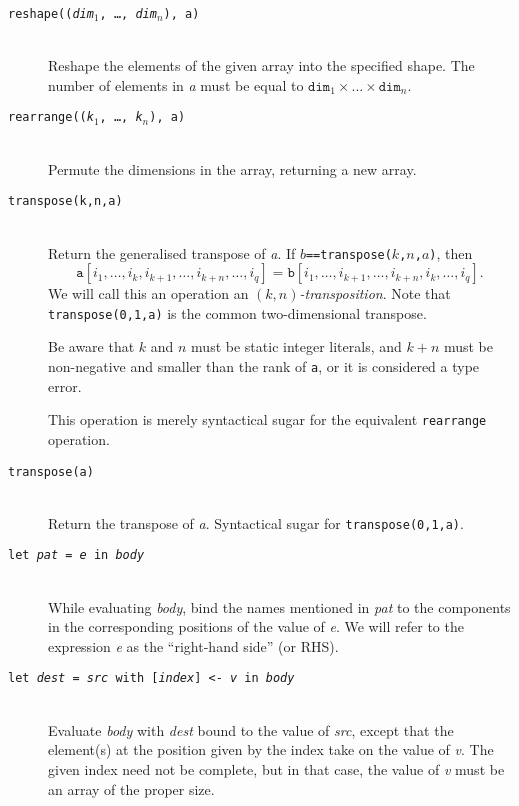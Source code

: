 \documentclass[oneside]{memoir}
\begin{document}
\begin{description}
  \item[\texttt{reshape((\textit{dim}$_{1}$, \ldots, \textit{dim}$_{n}$), a)}]\hfill\\
    Reshape the elements of the given array into the specified shape.
    The number of elements in \textit{a} must be equal to
    $\texttt{dim}_{1}\times\ldots\times\texttt{dim}_{n}$.

  \item[\texttt{rearrange((\textit{k}$_{1}$, \ldots, \textit{k}$_{n}$), a)}]\hfill\\
    Permute the dimensions in the array, returning a new array.

  \item[\texttt{transpose(k,n,a)}]\hfill\\
    Return the generalised transpose of \textit{a}.  If
    \texttt{$b$==transpose($k$,$n$,$a$)}, then
    \[
    \texttt{a}[i_1, \ldots, i_k, i_{k+1}, \ldots, i_{k+n}, \ldots, i_q ]
    =
    \texttt{b}[i_1 , \ldots, i_{k+1} , \ldots, i_{k+n}, i_k, \ldots, i_q ].
    \]
    We will call this an operation an \textit{$(k,n)$-transposition}.
    Note that \texttt{transpose(0,1,a)} is the common two-dimensional
    transpose.

    Be aware that $k$ and $n$ must be static integer literals, and
    $k+n$ must be non-negative and smaller than the rank of
    \texttt{a}, or it is considered a type error.

    This operation is merely syntactical sugar for the equivalent
    \texttt{rearrange} operation.

  \item[\texttt{transpose(a)}]\hfill\\
    Return the transpose of \textit{a}.  Syntactical sugar for
    \texttt{transpose(0,1,a)}.

  \item[\texttt{let \textit{pat} = \textit{e} in \textit{body}}]\hfill\\
    While evaluating \textit{body}, bind the names mentioned in
    \textit{pat} to the components in the corresponding positions of
    the value of \textit{e}.  We will refer to the expression
    \textit{e} as the ``right-hand side'' (or RHS).

  \item[\texttt{let \textit{dest} = \textit{src} with [\textit{index}] <- \textit{v} in \textit{body}}] \hfill \\
    Evaluate \textit{body} with \textit{dest} bound to the value of
    \textit{src}, except that the element(s) at the position given by
    the index take on the value of \textit{v}.  The given index need
    not be complete, but in that case, the value of \textit{v} must be
    an array of the proper size.


\end{description}
\end{document}
